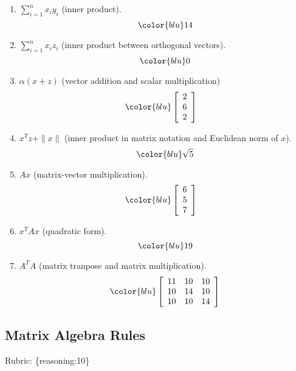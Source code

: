 \documentclass{article}
\def\rubric#1{\gre{Rubric: \{#1\}}}{}
\def\gre#1{{\color{gre}#1}}
\def\norm#1{\|#1\|}
\def\enum#1{\begin{enumerate}#1\end{enumerate}}
\begin{document}
\enum{
\item $\sum_{i=1}^n x_iy_i$ (inner product). 
\begin {equation} \color{blu}  14 \end {equation}
\item $\sum_{i=1}^n x_iz_i$ (inner product between orthogonal vectors).
\begin {equation}\color{blu}  0 \end {equation}
\item $\alpha(x+z)$ (vector addition and scalar multiplication)
\begin {equation}\color{blu} 
  \left[\begin{array}{c}
	2\\
	6\\
	2\\
\end{array}\right] \quad \end {equation}
\item $x^Tz + \norm{x}$ (inner product in matrix notation and Euclidean norm of $x$).
\begin {equation} \color{blu}  \sqrt{5} \end {equation}
\item $Ax$ (matrix-vector multiplication).
\begin {equation}\color{blu} 
\left[\begin{array}{c}
	6\\
	5\\
	7\\
\end{array}\right] \quad \end {equation}
\item $x^TAx$ (quadratic form).
\begin {equation} \color{blu}  19 \end {equation}
\item $A^TA$ (matrix tranpose and matrix multiplication).
\begin {equation}\color{blu} 
\left[\begin{array}{ccc}
	11 & 10 & 10\\
	10 & 14 & 10\\
	10 & 10 & 14
\end{array}\right]\end {equation}
}
\subsection{Matrix Algebra Rules}
\rubric{reasoning:10}
\end{document}
